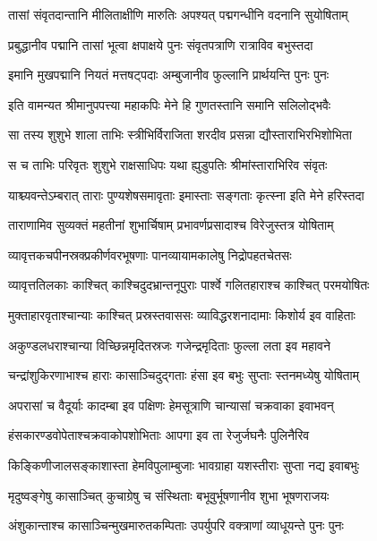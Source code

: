 \twolineshloka
{तासां संवृतदान्तानि मीलिताक्षीणि मारुतिः}
{अपश्यत् पद्मगन्धीनि वदनानि सुयोषिताम्} %

\twolineshloka
{प्रबुद्धानीव पद्मानि तासां भूत्वा क्षपाक्षये}
{पुनः संवृतपत्राणि रात्राविव बभुस्तदा} %

\twolineshloka
{इमानि मुखपद्मानि नियतं मत्तषट्पदाः}
{अम्बुजानीव फुल्लानि प्रार्थयन्ति पुनः पुनः} %

\twolineshloka
{इति वामन्यत श्रीमानुपपत्त्या महाकपिः}
{मेने हि गुणतस्तानि समानि सलिलोद्भवैः} %

\twolineshloka
{सा तस्य शुशुभे शाला ताभिः स्त्रीभिर्विराजिता}
{शरदीव प्रसन्ना द्यौस्ताराभिरभिशोभिता} %

\twolineshloka
{स च ताभिः परिवृतः शुशुभे राक्षसाधिपः}
{यथा ह्युडुपतिः श्रीमांस्ताराभिरिव संवृतः} %

\twolineshloka
{याश्च्यवन्तेऽम्बरात् ताराः पुण्यशेषसमावृताः}
{इमास्ताः सङ्गताः कृत्स्ना इति मेने हरिस्तदा} %

\twolineshloka
{ताराणामिव सुव्यक्तं महतीनां शुभार्चिषाम्}
{प्रभावर्णप्रसादाश्च विरेजुस्तत्र योषिताम्} %

\twolineshloka
{व्यावृत्तकचपीनस्रक्प्रकीर्णवरभूषणाः}
{पानव्यायामकालेषु निद्रोपहतचेतसः} %

\twolineshloka
{व्यावृत्ततिलकाः काश्चित् काश्चिदुदभ्रान्तनूपुराः}
{पार्श्वे गलितहाराश्च काश्चित् परमयोषितः} %

\twolineshloka
{मुक्ताहारवृताश्चान्याः काश्चित् प्रस्रस्तवाससः}
{व्याविद्धरशनादामाः किशोर्य इव वाहिताः} %

\twolineshloka
{अकुण्डलधराश्चान्या विच्छिन्नमृदितस्रजः}
{गजेन्द्रमृदिताः फुल्ला लता इव महावने} %

\twolineshloka
{चन्द्रांशुकिरणाभाश्च हाराः कासाञ्चिदुद्गताः}
{हंसा इव बभुः सुप्ताः स्तनमध्येषु योषिताम्} %

\twolineshloka
{अपरासां च वैदूर्याः कादम्बा इव पक्षिणः}
{हेमसूत्राणि चान्यासां चक्रवाका इवाभवन्} %

\twolineshloka
{हंसकारण्डवोपेताश्चक्रवाकोपशोभिताः}
{आपगा इव ता रेजुर्जघनैः पुलिनैरिव} %

\twolineshloka
{किङ्किणीजालसङ्काशास्ता हेमविपुलाम्बुजाः}
{भावग्राहा यशस्तीराः सुप्ता नद्य इवाबभुः} %

\twolineshloka
{मृदुष्वङ्गेषु कासाञ्चित् कुचाग्रेषु च संस्थिताः}
{बभूवुर्भूषणानीव शुभा भूषणराजयः} %

\twolineshloka
{अंशुकान्ताश्च कासाञ्चिन्मुखमारुतकम्पिताः}
{उपर्युपरि वक्त्राणां व्याधूयन्ते पुनः पुनः} %

